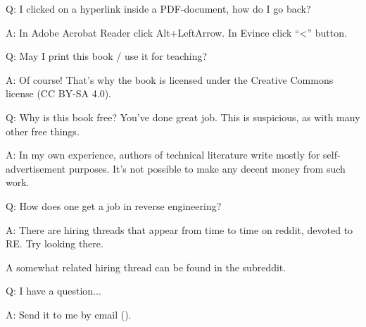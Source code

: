 \par Q: I clicked on a hyperlink inside a PDF-document, how do I go back?
\par A: In Adobe Acrobat Reader click Alt+LeftArrow. In Evince click ``<'' button.

\par Q: May I print this book / use it for teaching?
\par A: Of course! That's why the book is licensed under the Creative Commons license (CC BY-SA 4.0).

\par Q: Why is this book free? You've done great job. This is suspicious, as with many other free things.
\par A: In my own experience, authors of technical literature write mostly for self-advertisement purposes.
It's not possible to make any decent money from such work.

\par Q: How does one get a job in reverse engineering?
\par A: There are hiring threads that appear from time to time on reddit, devoted to RE\FNURLREDDIT{}.
Try looking there.

A somewhat related hiring thread can be found in the  subreddit.

\par Q: I have a question...
\par A: Send it to me by email (\EMAIL).
